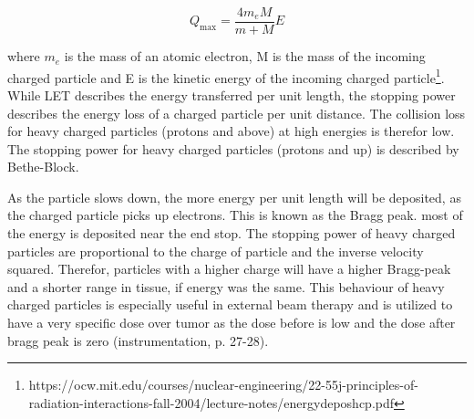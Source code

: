 \begin{equation} \label{eq:collision_E_transfer}
    Q_\text{max}=\frac{4m_eM}{m+M}E
\end{equation}

where $m_e$ is the mass of an atomic electron, M is the mass of the incoming charged particle and E is the kinetic energy of the incoming charged particle\footnote{https://ocw.mit.edu/courses/nuclear-engineering/22-55j-principles-of-radiation-interactions-fall-2004/lecture-notes/energydeposhcp.pdf}. While LET describes the energy transferred per unit length, the stopping power describes the energy loss of a charged particle per unit distance. The collision loss for heavy charged particles (protons and above) at high energies is therefor low. The stopping power for heavy charged particles (protons and up) is described by Bethe-Block.

 As the particle slows down, the more energy per unit length will be deposited, as the charged particle picks up electrons. This is known as the Bragg peak. most of the energy is deposited near the end stop. The stopping power of heavy charged particles are proportional to the charge of particle and the inverse velocity squared. Therefor, particles with a higher charge will have a higher Bragg-peak and a shorter range in tissue, if energy was the same. This behaviour of heavy charged particles is especially useful in external beam therapy and is utilized to have a very specific dose over tumor as the dose before is low and the dose after bragg peak is zero (instrumentation, p. 27-28). \\

